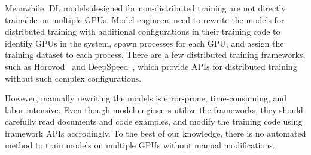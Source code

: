 Meanwhile, DL models designed for non-distributed training are not directly
trainable on multiple GPUs.
Model engineers need to rewrite the models for distributed training
with additional configurations in their training code to identify GPUs in the
system, spawn processes for each GPU, and assign the training dataset to each
process.
There are a few distributed training frameworks, such as
Horovod~\cite{sergeev2018horovod} and DeepSpeed~\cite{deepspeed}, which provide
APIs for distributed training without such complex configurations.

However, manually rewriting the models is error-prone, time-consuming, and
labor-intensive.
Even though model engineers utilize the frameworks, they should carefully
read documents and code examples, and modify the training code using
framework APIs accrodingly.
To the best of our knowledge, there is no automated method to train models on
multiple GPUs without manual modifications.




